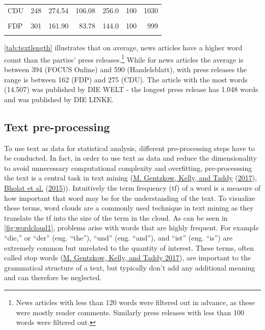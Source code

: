 \documentclass[
]{article}
\begin{document}
\begin{table}[H]
\begin{tabular}[t]{lrrrrrr}
\hspace{1em}CDU & 248 & 274.54 & 106.08 & 256.0 & 100 & 1030\\
\hspace{1em}\cellcolor{gray!6}{DIE LINKE} & \cellcolor{gray!6}{686} & \cellcolor{gray!6}{200.47} & \cellcolor{gray!6}{71.78} & \cellcolor{gray!6}{190.0} & \cellcolor{gray!6}{101} & \cellcolor{gray!6}{1048}\\
\hspace{1em}FDP & 301 & 161.90 & 83.78 & 144.0 & 100 & 999\\
\hspace{1em}\cellcolor{gray!6}{SPD} & \cellcolor{gray!6}{315} & \cellcolor{gray!6}{213.41} & \cellcolor{gray!6}{56.16} & \cellcolor{gray!6}{208.0} & \cellcolor{gray!6}{103} & \cellcolor{gray!6}{429}\\
\bottomrule
\end{tabular}
\end{table}

\autoref{tab:textlength} illustrates that on average, news articles have
a higher word count than the parties' press releases.\footnote{News
  articles with less than 120 words were filtered out in advance, as
  these were mostly reader comments. Similarly press releases with less
  than 100 words were filtered out.} While for news articles the average
is between 394 (FOCUS Online) and 590 (Handelsblatt), with press
releases the range is between 162 (FDP) and 275 (CDU). The article with
the most words (14.507) was published by DIE WELT - the longest press
release has 1.048 words and was published by DIE LINKE.

\hypertarget{text-pre-processing}{%
\subsection{Text pre-processing}\label{text-pre-processing}}

To use text as data for statistical analysis, different pre-processing
steps have to be conducted. In fact, in order to use text as data and
reduce the dimensionality to avoid unnecessary computational complexity
and overfitting, pre-processsing the text is a central task in text
mining (\protect\hyperlink{ref-gentzkow_text_2017}{M. Gentzkow, Kelly,
and Taddy} (\protect\hyperlink{ref-gentzkow_text_2017}{2017}),
\protect\hyperlink{ref-bholat_text_2015}{Bholat et al.}
(\protect\hyperlink{ref-bholat_text_2015}{2015})). Intuitively the term
frequency (tf) of a word is a measure of how important that word may be
for the understanding of the text. To visualize these terms, word clouds
are a commonly used technique in text mining as they translate the tf
into the size of the term in the cloud. As can be seen in
\autoref{fig:wordcloud1}, problems arise with words that are highly
frequent. For example ``die,'' or ``der'' (eng. ``the''), ``und'' (eng.
``and''), and ``ist'' (eng. ``is'') are extremely common but unrelated
to the quantity of interest. These terms, often called stop words
(\protect\hyperlink{ref-gentzkow_text_2017}{M. Gentzkow, Kelly, and
Taddy 2017}), are important to the grammatical structure of a text, but
typically don't add any additional meaning and can therefore be
neglected.
\end{document}
